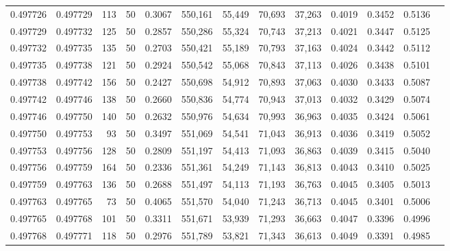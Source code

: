 \begin{tabular}{rrrrrrrrrrrrr}
0.497726 & 0.497729 &   113 &  50 &                                     0.3067 & 550,161 &  55,449 &  70,693 &  37,263 & 0.4019 & 0.3452 & 0.5136 \\
0.497729 & 0.497732 &   125 &  50 &                                     0.2857 & 550,286 &  55,324 &  70,743 &  37,213 & 0.4021 & 0.3447 & 0.5125 \\
0.497732 & 0.497735 &   135 &  50 &                                     0.2703 & 550,421 &  55,189 &  70,793 &  37,163 & 0.4024 & 0.3442 & 0.5112 \\
0.497735 & 0.497738 &   121 &  50 &                                     0.2924 & 550,542 &  55,068 &  70,843 &  37,113 & 0.4026 & 0.3438 & 0.5101 \\
0.497738 & 0.497742 &   156 &  50 &                                     0.2427 & 550,698 &  54,912 &  70,893 &  37,063 & 0.4030 & 0.3433 & 0.5087 \\
0.497742 & 0.497746 &   138 &  50 &                                     0.2660 & 550,836 &  54,774 &  70,943 &  37,013 & 0.4032 & 0.3429 & 0.5074 \\
0.497746 & 0.497750 &   140 &  50 &                                     0.2632 & 550,976 &  54,634 &  70,993 &  36,963 & 0.4035 & 0.3424 & 0.5061 \\
0.497750 & 0.497753 &    93 &  50 &                                     0.3497 & 551,069 &  54,541 &  71,043 &  36,913 & 0.4036 & 0.3419 & 0.5052 \\
0.497753 & 0.497756 &   128 &  50 &                                     0.2809 & 551,197 &  54,413 &  71,093 &  36,863 & 0.4039 & 0.3415 & 0.5040 \\
0.497756 & 0.497759 &   164 &  50 &                                     0.2336 & 551,361 &  54,249 &  71,143 &  36,813 & 0.4043 & 0.3410 & 0.5025 \\
0.497759 & 0.497763 &   136 &  50 &                                     0.2688 & 551,497 &  54,113 &  71,193 &  36,763 & 0.4045 & 0.3405 & 0.5013 \\
0.497763 & 0.497765 &    73 &  50 &                                     0.4065 & 551,570 &  54,040 &  71,243 &  36,713 & 0.4045 & 0.3401 & 0.5006 \\
0.497765 & 0.497768 &   101 &  50 &                                     0.3311 & 551,671 &  53,939 &  71,293 &  36,663 & 0.4047 & 0.3396 & 0.4996 \\
0.497768 & 0.497771 &   118 &  50 &                                     0.2976 & 551,789 &  53,821 &  71,343 &  36,613 & 0.4049 & 0.3391 & 0.4985 \\

\end{tabular}
